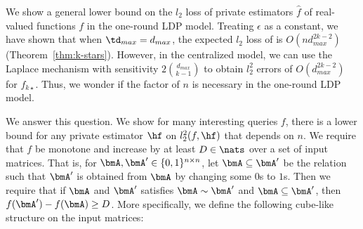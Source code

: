 We show a general lower bound on the $l_2$ loss of private estimators $\hat{f}$ of
real-valued functions $f$ in the one-round LDP model. Treating $\epsilon$ as a
constant, we have shown that 
when $\td_{max}=d_{max}$, 
the expected $l_2$ loss of  is 
$O(nd_{max}^{2k-2})$
(Theorem~\ref{thm:k-stars}). 
However, in
the centralized 
model, we can use
the Laplace mechanism with sensitivity 
$2\binom{d_{max}}{k-1}$ 
to obtain $l_2^2$ errors of $O(d_{max}^{2k-2})$ 
for $f_{k\star}$. 
Thus, we wonder
if 
the factor of $n$ is 
necessary 
in the one-round LDP model.

We 
answer this question.
We show for many interesting queries $f$, there is a lower bound for any private
estimator $\hf$ on $l_2^2(f, \hf)$ that depends on $n$.
% 
% 
We 
require that $f$ be monotone and increase by at least $D \in \nats$ over a set
of input matrices. 
That is, 
for $\bmA, \bmA' \in \{0,1\}^{n \times n}$, 
let $\bmA \subseteq \bmA'$ be the relation such that 
$\bmA'$ is obtained from $\bmA$ by changing some $0$s to $1$s. 
Then we require that 
if 
$\bmA$ and $\bmA'$ 
satisfies 
$\bmA \sim \bmA'$ and $\bmA \subseteq \bmA'$, then $f(\bmA') - f(\bmA) \geq D$.
More specifically, we define the following cube-like structure on the input matrices:


